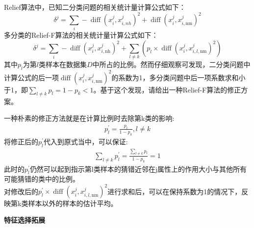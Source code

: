 \documentclass[answers]{exam}  %
\begin{document}
\begin{questions}
Relief算法中，已知二分类问题的相关统计量计算公式如下：
\begin{equation} \delta^{j}=\sum_{i}-\operatorname{diff}\left(x_{i}^{j}, x_{i, n h}^{j}\right)^{2}+\operatorname{diff}\left(x_{i}^{j}, x_{i, \mathrm{nm}}^{j}\right)^{2}
\end{equation}
多分类的Relief-F算法的相关统计量计算公式如下：
\begin{equation}
	\delta^{j}=\sum_{i}-\operatorname{diff}\left(x_{i}^{j}, x_{i, \mathrm{nh}}^{j}\right)^{2}+\sum_{l \neq k}\left(p_{l} \times \operatorname{diff}\left(x_{i}^{j}, x_{i, l, \mathrm{nm}}^{j}\right)^{2}\right)
\end{equation}
其中$p_l$为第$l$类样本在数据集$D$中所占的比例。然而仔细观察可发现，二分类问题中计算公式的后一项$\operatorname{diff}\left(x_{i}^{j}, x_{i, \mathrm{nm}}^{j}\right)^{2}$的系数为1，多分类问题中后一项系数求和小于1，即$\sum_{l \neq k}p_l = 1-p_k < 1$。基于这个发现，请给出一种Relief-F算法的修正方案。


\begin{solution}
	一种朴素的修正方法就是在计算比例时去除第k类的影响:\\
	\begin{align*}
		p_l^\prime = \frac{p_l}{1-p_k}, l\not= k
	\end{align*}
	将修正后的$p_l^\prime$代入到原式当中，可以保证:
	\begin{align*}
		\sum_{l \not= k} p_{l}^{\prime} = \frac{\sum_{l \not= k} p_l}{1-p_k} = 1
	\end{align*}
	此时的$p_l^\prime$仍然可以起到指示第l类样本的猜错近邻在j属性上的作用大小与其他所有可能猜错的类中的比例。\\
	对修改后的$p_l^\prime \times \operatorname{diff}\left(x_{i}^{j}, x_{i, l, \mathrm{nm}}^{j}\right)^{2}$进行求和后，可以在保持系数为1的情况下，反映第k类样本以外的样本的估计平均。\\
\end{solution}

\question [15] \textbf{特征选择拓展}


\end{questions}
\end{document}
